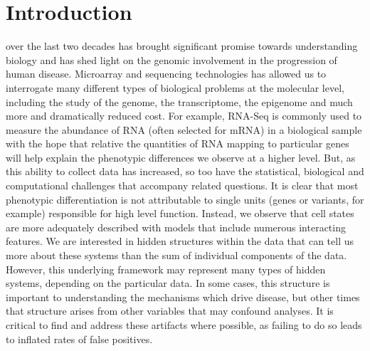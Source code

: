 \chapter{Introduction}
\label{introduction}
 over the last two decades has brought significant promise towards understanding biology and has shed light on the genomic involvement in the progression of human disease. Microarray and sequencing technologies has allowed us to interrogate many different types of biological problems at the molecular level, including the study of the genome, the transcriptome, the epigenome and much more and dramatically reduced cost. For example, RNA-Seq is commonly used to measure the abundance of RNA (often selected for mRNA) in a biological sample with the hope that relative the quantities of RNA mapping to particular genes will help explain the phenotypic differences we observe at a higher level. But, as this ability to collect data has increased, so too have the statistical, biological and computational challenges that accompany related questions. It is clear that most phenotypic differentiation is not attributable to single units (genes or variants, for example) responsible for high level function. Instead, we observe that cell states are more adequately described with models that include numerous interacting features. We are interested in hidden structures within the data that can tell us more about these systems than the sum of individual components of the data. However, this underlying framework may represent many types of hidden systems, depending on the particular data. In some cases, this structure is important to understanding the mechanisms which drive disease, but other times that structure arises from other variables that may confound analyses. It is critical to find and address these artifacts where possible, as failing to do so leads to inflated rates of false positives.

